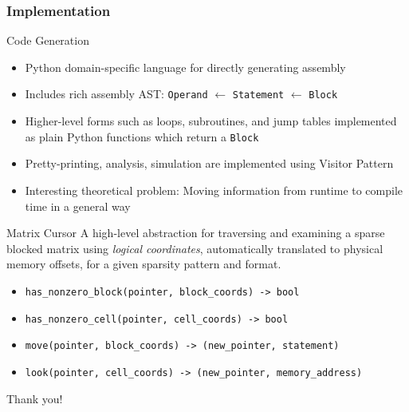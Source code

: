 \documentclass[9pt]{beamer}
\begin{document}
\begin{frame}[fragile]
  \frametitle{Implementation}

  \begin{block}{Code Generation}
    \begin{itemize}
    \item Python domain-specific language for directly generating assembly
    \item Includes rich assembly AST: \texttt{Operand} $\leftarrow$ \texttt{Statement} $\leftarrow$ \texttt{Block} 
    \item Higher-level forms such as loops, subroutines, and jump tables
          implemented as plain Python functions which return a \texttt{Block}
    \item Pretty-printing, analysis, simulation are implemented using Visitor Pattern
    \item Interesting theoretical problem: Moving information from runtime to compile time in a general way
    \end{itemize}
  \end{block}

  \begin{block}{Matrix Cursor}
    A high-level abstraction for traversing and examining a sparse blocked matrix using \emph{logical coordinates}, automatically translated to physical memory offsets, for a given sparsity pattern and format. 
    \begin{itemize}
    \item \verb|has_nonzero_block(pointer, block_coords) -> bool|
    \item \verb|has_nonzero_cell(pointer, cell_coords) -> bool|
    \item \verb|move(pointer, block_coords) -> (new_pointer, statement)|
    \item \verb|look(pointer, cell_coords) -> (new_pointer, memory_address)|
    \end{itemize}
    \end{block}
\end{frame}

\begin{frame}[plain,c]
\begin{center}
    \huge Thank you!
\end{center}
\end{frame}
\end{document}
